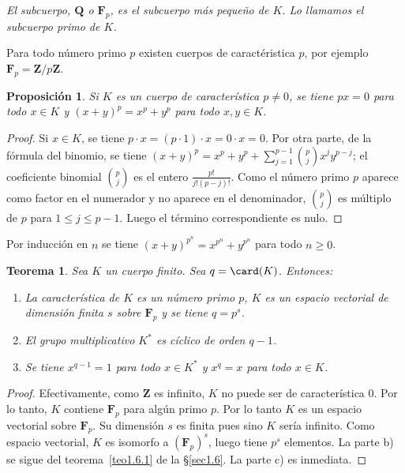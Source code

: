 \documentclass[oneside,bibtotoc,leqno,spanish]{amsbook}
\newcommand{\QQ}{\mathbf{Q}}
\newcommand{\ZZ}{\mathbf{Z}}
\newcommand{\FF}{\mathbf{F}}
\numberwithin{equation}{section}
\newenvironment{comm}%
	{\begin{trivlist}\item\small\itshape}
	{\end{trivlist}}
\theoremstyle{defi}
\theoremstyle{note}
\newtheorem{theorem}{Teorema}
\newtheorem{proposition}{Proposici\'on}
\theoremstyle{rem}
\numberwithin{theorem}{section}
\numberwithin{proposition}{section}
\numberwithin{definition}{section}
\numberwithin{lemma}{section}
\numberwithin{corollary}{section}
\numberwithin{example}{section}
\numberwithin{footnote}{section}%
\begin{document}
\begin{comm}
El subcuerpo, $\QQ$ o $\FF_{p}$, es el subcuerpo m\'as
peque\~no de $K$. Lo llamamos el {\em subcuerpo primo} de $K$.

Para todo n\'umero primo $p$ existen cuerpos de caract\'eristica $p$,
por ejemplo $\FF_{p} = \ZZ/p\ZZ$.
\end{comm}

\begin{proposition}\label{prop1.7.1}
Si $K$ es un cuerpo de caracter\'istica $p\neq 0$, se tiene
$px = 0$ para todo $x\in K$ y $(x+y)^{p} = x^{p}+y^{p}$ para
todo $x, y\in K$.
\end{proposition}

\begin{proof}
Si $x\in K$, se tiene $p\cdot x = (p\cdot 1)\cdot x = 0\cdot x = 0$. Por otra parte,
de la f\'ormula del binomio, se tiene $(x+y)^{p} = x^{p}+y^{p}+\sum_{j=1}^{p-1}\binom{p}{j}x^{j}y^{p-j}$;
el coeficiente binomial $\binom{p}{j}$ es el entero $\frac{p!}{j!(p-j)!}$. Como el n\'umero primo
$p$ aparece como factor en el numerador y no aparece en el denominador, $\binom{p}{j}$ es m\'ultiplo
de $p$ para $1\leq j\leq p-1$. Luego el t\'ermino correspondiente es nulo.
\end{proof}

Por inducci\'on en $n$ se tiene $(x+y)^{p^{n}}=x^{p^{n}}+y^{p^{n}}$ para todo $n\geq 0$.

\begin{theorem}\label{teo1.7.1}
Sea $K$ un cuerpo finito. Sea $q = \card(K)$. Entonces:
\begin{enumerate}%
\item[a)] La caracter\'istica de $K$ es un n\'umero primo $p$, $K$ es un espacio vectorial de
dimensi\'on finita $s$ sobre $\FF_{p}$ y se tiene $q = p^{s}$.
\item[b)] El grupo multiplicativo $K^{*}$ es c\'iclico de orden $q-1$.
\item[c)] Se tiene $x^{q-1} = 1$ para todo $x\in K^{*}$ y $x^{q} = x$ para todo $x\in K$.
\end{enumerate}
\end{theorem}

\begin{proof}
Efectivamente, como $\ZZ$ es infinito, $K$ no puede ser de caracter\'istica $0$. Por lo tanto,
$K$ contiene $\FF_{p}$ para alg\'un primo $p$. Por lo tanto $K$ es un espacio vectorial sobre
$\FF_{p}$. Su dimensi\'on $s$ es finita pues sino $K$ ser\'ia infinito. Como espacio vectorial,
$K$ es isomorfo a $(\FF_{p})^{s}$, luego tiene $p^{s}$ elementos. La parte b) se sigue del
teorema~\ref{teo1.6.1} de la \S\ref{sec1.6}. La parte c) es inmediata.
\end{proof}
\end{document}
